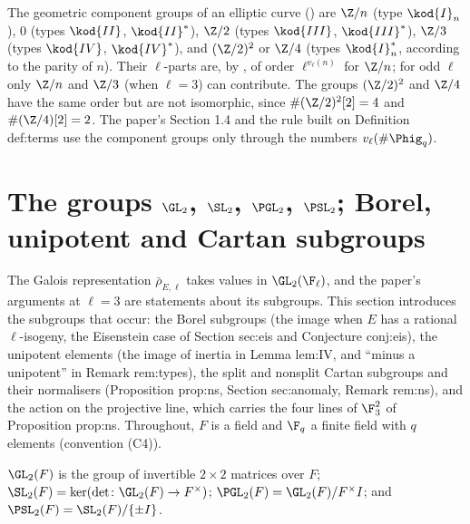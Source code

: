 \begin{example}\label{ex:groups:componentgroups}
The geometric component groups of an elliptic curve () are $\Z/n$ (type $\kod{I}_n$), $0$ (types $\kod{II}$, $\kod{II}^*$), $\Z/2$
(types $\kod{III}$, $\kod{III}^*$), $\Z/3$ (types $\kod{IV}$, $\kod{IV}^*$), and $(\Z/2)^2$ or $\Z/4$ (types $\kod{I}_n^*$, according to the parity of $n$).
Their $\ell$-parts are, by , of order $\ell^{v_\ell(n)}$ for $\Z/n$; for odd $\ell$ only $\Z/n$ and $\Z/3$ (when $\ell=3$) can
contribute. The groups $(\Z/2)^2$ and $\Z/4$ have the same order but are not isomorphic, since $\#(\Z/2)^2[2]=4$ and $\#(\Z/4)[2]=2$. The paper's Section 1.4 and
the rule built on Definition def:terms use the component groups only through the numbers $v_\ell(\#\Phig_q)$.
\end{example}

\section[Matrix groups over a field]{The groups \texorpdfstring{$\GL_2$, $\SL_2$, $\PGL_2$, $\PSL_2$}{GL2, SL2, PGL2, PSL2}; Borel, unipotent and Cartan subgroups}\label{sec:groups:matrix}

The Galois representation $\bar\rho_{E,\ell}$ takes values in $\GL_2(\F_\ell)$, and the paper's arguments at $\ell=3$ are statements about its
subgroups. This section introduces the subgroups that occur: the Borel subgroups (the image when $E$ has a rational $\ell$-isogeny, the
Eisenstein case of Section sec:eis and Conjecture conj:eis), the unipotent elements (the image of inertia in Lemma lem:IV, and ``minus a
unipotent'' in Remark rem:types), the split and nonsplit Cartan subgroups and their normalisers (Proposition prop:ns, Section sec:anomaly,
Remark rem:ns), and the action on the projective line, which carries the four lines of $\F_3^2$ of Proposition prop:ns. Throughout, $F$ is a
field and $\F_q$ a finite field with $q$ elements (convention (C4)).

\begin{definition}\label{def:groups:gl2}
$\GL_2(F)$ is the group of invertible $2\times2$ matrices over $F$; $\SL_2(F)=\ker(\det\colon\GL_2(F)\to F^\times)$; $\PGL_2(F)=\GL_2(F)/F^\times I$; and
$\PSL_2(F)=\SL_2(F)/\{\pm I\}$.
\end{definition}

